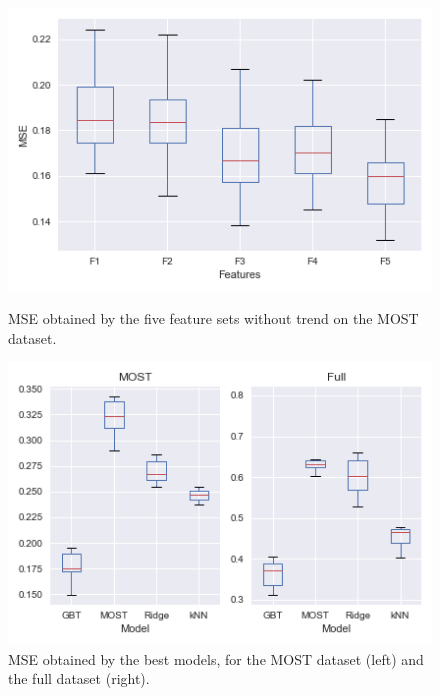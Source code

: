 \documentclass[a4paper]{book}
\begin{document}
\begin{figure}
    \centering
    \begin{minipage}[t]{0.49\textwidth}
        \centering
        \includegraphics[width=\textwidth]{images/fset_comparison}
        \caption{MSE obtained by the five feature sets without trend on the MOST dataset.}
        \label{fig:fset_comparison}
    \end{minipage}
    \hfill
    \begin{minipage}[t]{0.49\textwidth}
        \centering
        \includegraphics[width=\textwidth]{images/baseline_comparison}
        \caption{MSE obtained by the best models, for the MOST dataset (left) and the full dataset (right).}
        \label{fig:baseline_comparison}
    \end{minipage}
\end{figure}
\end{document}
